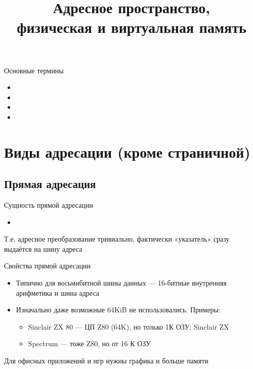 \documentclass[xetex,aspectratio=43]{beamer}
\title[АП и ВП]{Адресное пространство,\\физическая и виртуальная память}
\begin{document}
    \titleslide

    \tocslide

\begin{frame}{Основные термины}
    \begin{itemize}
        \item
        \item
        \item
        \item
    \end{itemize}

\end{frame}

\section{Виды адресации (кроме страничной)}

\subsection{Прямая адресация}

\begin{frame}{Сущность прямой адресации}
    \begin{itemize}
        \item
    \end{itemize}

    Т.е. адресное преобразование тривиально, фактически «указатель» сразу
    выдаётся на шину адреса
\end{frame}

\begin{frame}{Свойства прямой адресации}
    \begin{itemize}
        \item
        Типично для восьмибитной шины данных --- 16-битные внутренняя арифметика и шина адреса
        \item
        Изначально даже возможные 64KiB не использовались. Примеры:

        \begin{itemize}
            \item Sinclair ZX 80 --- ЦП Z80 (64K), но только 1К ОЗУ; Sinclair ZX
            \item Spectrum --- тоже Z80, но от 16 К ОЗУ
        \end{itemize}
    \end{itemize}

    \pause

    Для офисных приложений и игр нужны графика и больше памяти
\end{frame}
\end{document}
